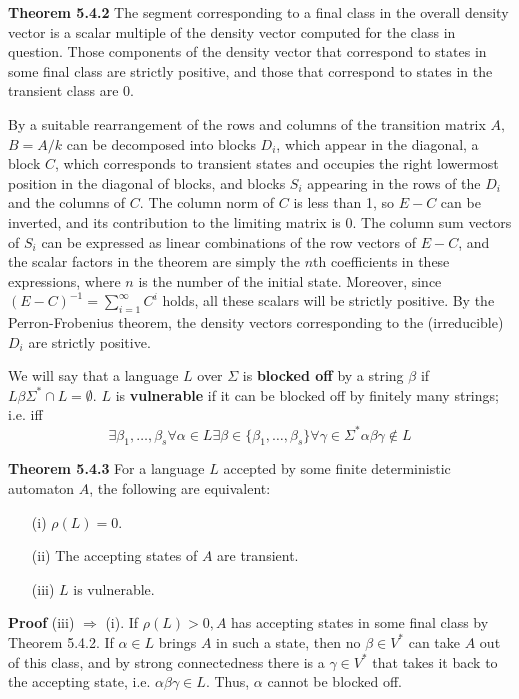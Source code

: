 \medskip\noindent
{\bf Theorem 5.4.2} 
The segment corresponding to a final class in the overall density vector is
a scalar multiple of the density vector computed for the class in question. 
Those components of the density vector that correspond to states in some
final class are strictly positive, and those that correspond to states in
the transient class are 0. 

\smallskip{} By a suitable rearrangement of the rows and
columns of the transition matrix $A,$ $B=A/k$ can be decomposed into blocks
$D_i$, which appear in the diagonal, a block $C$, which corresponds to
transient states and occupies the right lowermost position in the diagonal of
blocks, and blocks $S_i$ appearing in the rows of the $D_i$ and the columns of
$C$.  The column norm of $C$ is less than 1, so $E-C$ can be inverted, and its
contribution to the limiting matrix is 0. The column sum vectors of $S_i$ can
be expressed as linear combinations of the row vectors of $E-C$, and the
scalar factors in the theorem are simply the $n$th coefficients in these
expressions, where $n$ is the number of the initial state. Moreover, since
$(E-C)^{-1}=\sum_{i=1}^{\infty} C^i$ holds, all these scalars will be strictly
positive. By the Perron-Frobenius theorem, the density vectors corresponding
to the (irreducible) $D_i$ are strictly positive.

\medskip We will say that a language $L$ over $\Sigma$ is {\bf blocked off} by
a string $\beta$ if $L\beta \Sigma^* \cap L = \emptyset$. $L$ is {\bf
vulnerable} if it can be blocked off by finitely many strings; i.e. iff
$$\exists \beta_1, \ldots, \beta_s \forall \alpha \in L \exists \beta \in
\{\beta_1,\ldots,\beta_s\} \forall \gamma \in \Sigma^* \alpha\beta\gamma
\not\in L$$ 


\medskip\noindent
{\bf Theorem 5.4.3} For a language $L$ accepted by some finite deterministic
automaton $A$, the following are equivalent:
\begin{itemize}
\item[(i)] $\rho(L)=0$.
\item[(ii)] The accepting states of $A$ are transient.
\item[(iii) ] $ L$ is vulnerable. 
\end{itemize}

\smallskip
\noindent
{\bf Proof} (iii) $\Rightarrow$ (i). If $\rho (L) > 0, A$ 
has accepting states in some final class by Theorem 5.4.2. If $\alpha \in L$
brings $A$ in such a state, then no $\beta \in V^*$ can take $A$
out of this class, and by strong connectedness there is a $\gamma \in V^*$
that takes it back to the accepting state, i.e. $\alpha\beta\gamma \in
L$. Thus, $\alpha$ cannot be blocked off.

